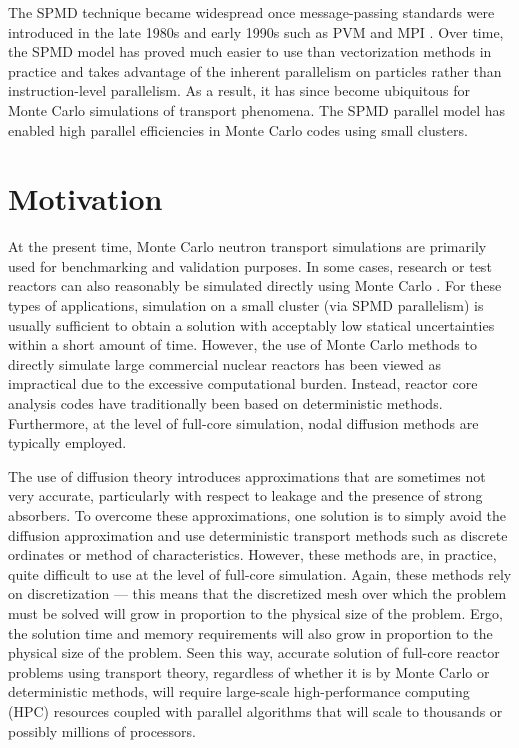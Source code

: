 The SPMD technique became widespread once message-passing standards were
introduced in the late 1980s and early 1990s such as PVM
\cite{ornl-beguelin-1991} and MPI \cite{gropp-1999}. Over time, the SPMD model
has proved much easier to use than vectorization methods in practice and takes
advantage of the inherent parallelism on particles rather than instruction-level
parallelism. As a result, it has since become ubiquitous for Monte Carlo
simulations of transport phenomena. The SPMD parallel model has enabled high
parallel efficiencies in Monte Carlo codes using small clusters.

\section{Motivation}

At the present time, Monte Carlo neutron transport simulations are primarily
used for benchmarking and validation purposes. In some cases, research or test
reactors can also reasonably be simulated directly using Monte Carlo
\cite{anfm-romano-2009}. For these types of applications, simulation on a small
cluster (via SPMD parallelism) is usually sufficient to obtain a solution with
acceptably low statical uncertainties within a short amount of time. However,
the use of Monte Carlo methods to directly simulate large commercial nuclear
reactors has been viewed as impractical due to the excessive computational
burden. Instead, reactor core analysis codes have traditionally been based on
deterministic methods. Furthermore, at the level of full-core simulation, nodal
diffusion methods are typically employed.

The use of diffusion theory introduces approximations that are sometimes not
very accurate, particularly with respect to leakage and the presence of strong
absorbers. To overcome these approximations, one solution is to simply avoid the
diffusion approximation and use deterministic transport methods such as discrete
ordinates or method of characteristics. However, these methods are, in practice,
quite difficult to use at the level of full-core simulation. Again, these
methods rely on discretization --- this means that the discretized mesh over
which the problem must be solved will grow in proportion to the physical size of
the problem. Ergo, the solution time and memory requirements will also grow in
proportion to the physical size of the problem. Seen this way, accurate solution
of full-core reactor problems using transport theory, regardless of whether it
is by Monte Carlo or deterministic methods, will require large-scale
high-performance computing (HPC) resources coupled with parallel algorithms that
will scale to thousands or possibly millions of processors.

